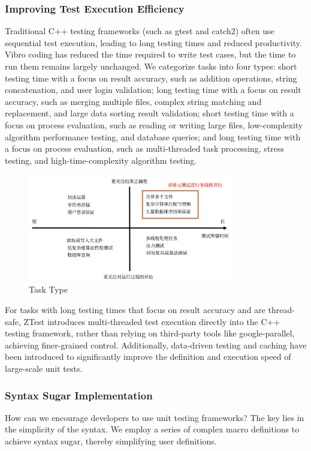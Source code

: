 \documentclass{article}
\begin{document}
\subsubsection{Improving Test Execution Efficiency}
Traditional C++ testing frameworks (such as gtest and catch2) often use sequential test execution, leading to long testing times and reduced productivity. Vibro coding has reduced the time required to write test cases, but the time to run them remains largely unchanged.
We categorize tasks into four types: short testing time with a focus on result accuracy, such as addition operations, string concatenation, and user login validation; long testing time with a focus on result accuracy, such as merging multiple files, complex string matching and replacement, and large data sorting result validation; short testing time with a focus on process evaluation, such as reading or writing large files, low-complexity algorithm performance testing, and database queries; and long testing time with a focus on process evaluation, such as multi-threaded task processing, stress testing, and high-time-complexity algorithm testing.
\begin{figure}[H]
    \centering
    \includegraphics[width=0.8\textwidth]{img/task.png} %
    \caption{ Task Type}
    \label{fig:task types }
\end{figure}
For tasks with long testing times that focus on result accuracy and are thread-safe, ZTest introduces multi-threaded test execution directly into the C++ testing framework, rather than relying on third-party tools like google-parallel, achieving finer-grained control.
Additionally, data-driven testing and caching have been introduced to significantly improve the definition and execution speed of large-scale unit tests.
\subsubsection{Syntax Sugar Implementation}
How can we encourage developers to use unit testing frameworks? The key lies in the simplicity of the syntax. We employ a series of complex macro definitions to achieve syntax sugar, thereby simplifying user definitions.
\end{document}
